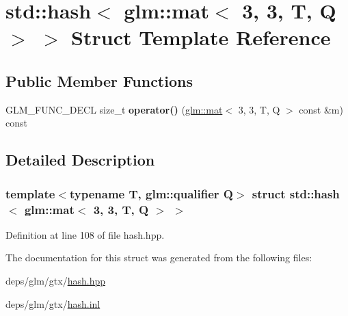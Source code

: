 \hypertarget{structstd_1_1hash_3_01glm_1_1mat_3_013_00_013_00_01T_00_01Q_01_4_01_4}{}\section{std\+:\+:hash$<$ glm\+:\+:mat$<$ 3, 3, T, Q $>$ $>$ Struct Template Reference}
\label{structstd_1_1hash_3_01glm_1_1mat_3_013_00_013_00_01T_00_01Q_01_4_01_4}
\subsection*{Public Member Functions}
\begin{DoxyCompactItemize}
\item 
\mbox{\label{structstd_1_1hash_3_01glm_1_1mat_3_013_00_013_00_01T_00_01Q_01_4_01_4_a090c5c19c61f9633dc2aac7783f334f1}} 
G\+L\+M\+\_\+\+F\+U\+N\+C\+\_\+\+D\+E\+CL size\+\_\+t {\bfseries operator()} (\hyperlink{structglm_1_1mat}{glm\+::mat}$<$ 3, 3, T, Q $>$ const \&m) const
\end{DoxyCompactItemize}


\subsection{Detailed Description}
\subsubsection*{template$<$typename T, glm\+::qualifier Q$>$\newline
struct std\+::hash$<$ glm\+::mat$<$ 3, 3, T, Q $>$ $>$}



Definition at line 108 of file hash.\+hpp.



The documentation for this struct was generated from the following files\+:\begin{DoxyCompactItemize}
\item 
deps/glm/gtx/\hyperlink{hash_8hpp}{hash.\+hpp}\item 
deps/glm/gtx/\hyperlink{hash_8inl}{hash.\+inl}\end{DoxyCompactItemize}
